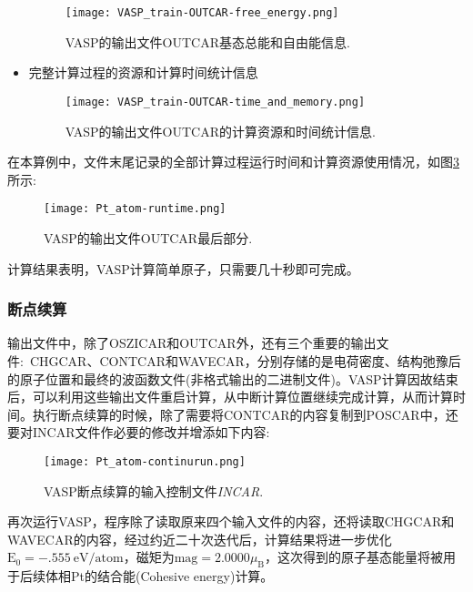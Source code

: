 \begin{itemize}
\begin{figure}[h!]
\centering
\texttt{[image: VASP\_train-OUTCAR-free\_energy.png]}
\caption{\small \textrm{VASP}的输出文件\textrm{OUTCAR}基态总能和自由能信息.}%
\label{VASP_train-OUTCAR-free_energy}
\end{figure}
	\item 完整计算过程的资源和计算时间统计信息
\begin{figure}[h!]
\centering
\texttt{[image: VASP\_train-OUTCAR-time\_and\_memory.png]}
\caption{\small \textrm{VASP}的输出文件\textrm{OUTCAR}的计算资源和时间统计信息.}%
\label{VASP_train-OUTCAR-time_and_memory}
\end{figure}
\end{itemize}

在本算例中，文件末尾记录的全部计算过程运行时间和计算资源使用情况，如图\ref{Pt_atom:runtime}所示:
\begin{figure}[h!]
\centering
\texttt{[image: Pt\_atom-runtime.png]}
\caption{\small \textrm{VASP}的输出文件\textrm{OUTCAR}最后部分.}%
\label{Pt_atom:runtime}
\end{figure}

计算结果表明，\textrm{VASP}计算简单原子，只需要几十秒即可完成。
\subsubsection{断点续算}
输出文件中，除了\textrm{OSZICAR}和\textrm{OUTCAR}外，还有三个重要的输出文件:~\textrm{CHGCAR}、\textrm{CONTCAR}和\textrm{WAVECAR}，分别存储的是电荷密度、结构弛豫后的原子位置和最终的波函数文件(非格式输出的二进制文件)。\textrm{VASP}计算因故结束后，可以利用这些输出文件重启计算，从中断计算位置继续完成计算，从而计算时间。执行断点续算的时候，除了需要将\textrm{CONTCAR}的内容复制到\textrm{POSCAR}中，还要对\textrm{INCAR}文件作必要的修改并增添如下内容:
\begin{figure}[h!]
\centering
\vskip -5pt
\texttt{[image: Pt\_atom-continurun.png]}
\caption{\small \textrm{VASP}断点续算的输入控制文件\textit{INCAR}.}%
\label{Pt_atom:continuruntime}
\end{figure}

再次运行\textrm{VASP}，程序除了读取原来四个输入文件的内容，还将读取\textrm{CHGCAR}和\textrm{WAVECAR}的内容，经过约近二十次迭代后，计算结果将进一步优化$\mathrm{E}_0=-.555\mathrm{~eV/atom}$，磁矩为$\mathrm{mag}=2.0000\mu_{\mathrm{B}}$，这次得到的原子基态能量将被用于后续体相\textrm{Pt}的结合能\textrm{(Cohesive energy)}计算。

